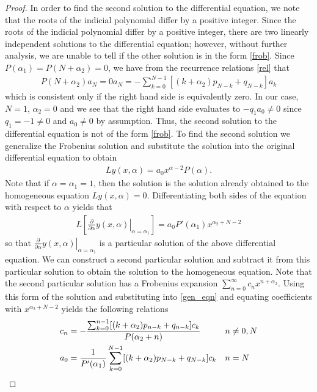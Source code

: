 \documentclass[12pt]{article}
\theoremstyle{definition}
\begin{document}
\begin{proof}
  In order to find the second solution to the differential equation, we note that
  the roots of the indicial polynomial differ by a positive integer. Since the roots of the indicial polynomial differ by a positive integer,
  there are two linearly independent solutions to the differential equation;
  however, without further analysis, we are unable to tell if the other solution is in the form \eqref{frob}.
  Since $P(\alpha_1) = P(N + \alpha_2) = 0$, we have from the recurrence relations \eqref{rel} that
  \begin{align*}
    P(N+\alpha_2)a_N = 0a_N = -\sum_{k=0}^{N-1}\left[(k+\alpha_2) p_{N-k} + q_{N-k}\right]a_k
  \end{align*}
  which is consistent only if the right hand side is equivalently zero. In our case, $N=1$, $\alpha_2 = 0$
  and we see that the right hand side evaluates to $-q_1a_0 \neq 0$ since $q_1 = -1 \neq 0$ and $a_0 \neq 0$ by assumption. Thus, the second solution to the differential equation is not of the form
  \eqref{frob}. To find the second solution we generalize the Frobenius solution
  and substitute the solution into the original differential equation to obtain
  \begin{align*}
    Ly(x,\alpha) = a_0 x^{\alpha - 2}P(\alpha).
  \end{align*}
  Note that if $\alpha=\alpha_1 = 1$, then the solution is the solution already obtained to the homogeneous equation $Ly(x,\alpha) = 0$.
  Differentiating both sides of the equation with respect to $\alpha$ yields that
  \begin{align}\label{gen_eqn}
    L\left[\left.\frac{\partial}{\partial\alpha}y(x,\alpha)\right|_{\alpha=\alpha_1}\right] = a_0P'(\alpha_1) x^{\alpha_2+N-2}
  \end{align}
  so that $\left.\frac{\partial}{\partial\alpha}y(x,\alpha)\right|_{\alpha=\alpha_1}$ is a particular solution of the above differential equation.
  We can construct a second particular solution and subtract it from this particular solution to obtain the solution to the homogeneous equation. Note that the second particular
  solution has a Frobenius expansion $\sum_{n=0}^{\infty}c_n x^{n+\alpha_2}$.
  Using this form of the solution and substituting into \eqref{gen_eqn} and equating coefficients with $x^{\alpha_2+N-2}$ yields the following
  relations
  \begin{align}\label{sec_rel}
    c_n &=- \frac{\sum_{k=0}^{n-1} [(k + \alpha_2)p_{n-k} + q_{n-k}]c_k}{P(\alpha_2 + n)} &n&\neq0,N \notag\\
    a_0 &= \frac{1}{P'(\alpha_1)}\sum_{k=0}^{N-1}[(k + \alpha_2)p_{N-k} + q_{N-k}]c_k &n&=N

\end{align}
\end{proof}
\end{document}
